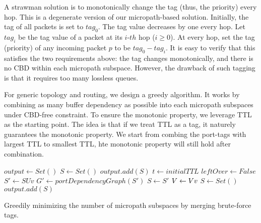  A strawman solution is to monotonically change the tag (thus, the priority) every hop.
This is a degenerate version of our micropath-based solution.
Initially, the tag of all packets is set to $tag_0$. The tag value decreases by one every hop. 
Let $tag_i$ be the tag value of a packet at its $i$-$th$ hop ($i \geq 0$). At every hop, 
set the tag (priority) of any incoming packet $p$ to be $tag_0 - tag_i$. 
It is easy to verify that this satisfies the two requirements above: the tag changes monotonically, and there is no CBD
within each micropath subspace.
However, the drawback of such tagging is that it requires too many lossless queues. 
\fi





 For generic topology and routing, we design a greedy algorithm.
It works by combining as many buffer dependency as possible into each micropath subspaces under CBD-free constraint.
To ensure the monotonic property, we leverage TTL as the starting point. The idea is that if we treat TTL as a tag,
it naturely guarantees the monotonic property. We start from combing the port-tags with largest TTL to smallest TTL,
hte monotonic property will still hold after combination. 


\begin{algorithm}
	$output \gets Set()$\; 
	$S \gets Set()$\; 
	$output.add(S)$\;
	$t \gets initialTTL$\;
	 {
    	$leftOver \gets False$\; 
		 {
			$S' \gets S U {v}$ \;
			$G' \gets portDependencyGraph(S')$ \;
			 {
				$S \gets S'$ \; 
				$V \gets V \\ {v}$ \;
			}
		}
		 {
			$S \gets Set()$\; 
			$output.add(S)$\;
		}
	}
	\;
    \caption{Greedily minimizing the number of micropath subspaces by merging brute-force tags.}
\end{algorithm}


